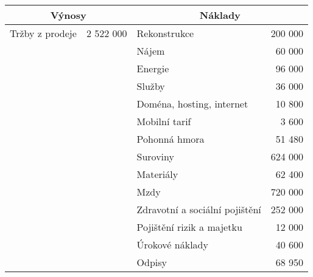 \begin{table}[htbp]
\begin{center}
\begin{tabular}{lllr}
\multicolumn{2}{c}{\textbf{Výnosy}}                    & \multicolumn{2}{c}{\textbf{Náklady}}                \\ \hline
Tržby z prodeje        & \multicolumn{1}{r}{2 522 000} & Rekonstrukce                   & 200 000            \\
                       & \multicolumn{1}{r}{}          & Nájem                          & 60 000             \\
                       &                               & Energie                        & 96 000             \\
                       &                               & Služby                         & 36 000             \\
                       &                               & Doména, hosting, internet      & 10 800             \\
                       &                               & Mobilní tarif                  & 3 600              \\
                       &                               & Pohonná hmora                  & 51 480             \\
                       &                               & Suroviny                       & 624 000            \\
                       &                               & Materiály                      & 62 400             \\
                       &                               & Mzdy                           & 720 000            \\
                       &                               & Zdravotní a sociální pojištění & 252 000            \\
                       &                               & Pojištění rizik a majetku      & 12 000             \\
                       &                               & Úrokové náklady                & 40 600             \\
                       &                               & Odpisy                         & 68 950             \\ \hline

\end{tabular}
\end{center}
\end{table}

